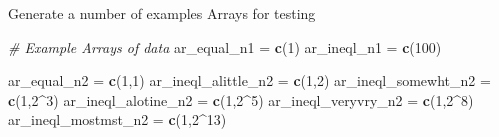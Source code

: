 \documentclass[
]{book}
\newenvironment{Shaded}{\begin{snugshade}}{\end{snugshade}}
\newcommand{\CommentTok}[1]{\textcolor[rgb]{0.56,0.35,0.01}{\textit{#1}}}
\newcommand{\DecValTok}[1]{\textcolor[rgb]{0.00,0.00,0.81}{#1}}
\newcommand{\KeywordTok}[1]{\textcolor[rgb]{0.13,0.29,0.53}{\textbf{#1}}}
\newcommand{\NormalTok}[1]{#1}
\newcommand{\OperatorTok}[1]{\textcolor[rgb]{0.81,0.36,0.00}{\textbf{#1}}}
\newcommand{\StringTok}[1]{\textcolor[rgb]{0.31,0.60,0.02}{#1}}
\begin{document}
Generate a number of examples Arrays for testing

\begin{Shaded}
\begin{Highlighting}[]
\CommentTok{\# Example Arrays of data}
\NormalTok{ar\_equal\_n1 =}\StringTok{ }\KeywordTok{c}\NormalTok{(}\DecValTok{1}\NormalTok{)}
\NormalTok{ar\_ineql\_n1 =}\StringTok{ }\KeywordTok{c}\NormalTok{(}\DecValTok{100}\NormalTok{)}

\NormalTok{ar\_equal\_n2 =}\StringTok{ }\KeywordTok{c}\NormalTok{(}\DecValTok{1}\NormalTok{,}\DecValTok{1}\NormalTok{)}
\NormalTok{ar\_ineql\_alittle\_n2 =}\StringTok{ }\KeywordTok{c}\NormalTok{(}\DecValTok{1}\NormalTok{,}\DecValTok{2}\NormalTok{)}
\NormalTok{ar\_ineql\_somewht\_n2 =}\StringTok{ }\KeywordTok{c}\NormalTok{(}\DecValTok{1}\NormalTok{,}\DecValTok{2}\OperatorTok{\^{}}\DecValTok{3}\NormalTok{)}
\NormalTok{ar\_ineql\_alotine\_n2 =}\StringTok{ }\KeywordTok{c}\NormalTok{(}\DecValTok{1}\NormalTok{,}\DecValTok{2}\OperatorTok{\^{}}\DecValTok{5}\NormalTok{)}
\NormalTok{ar\_ineql\_veryvry\_n2 =}\StringTok{ }\KeywordTok{c}\NormalTok{(}\DecValTok{1}\NormalTok{,}\DecValTok{2}\OperatorTok{\^{}}\DecValTok{8}\NormalTok{)}
\NormalTok{ar\_ineql\_mostmst\_n2 =}\StringTok{ }\KeywordTok{c}\NormalTok{(}\DecValTok{1}\NormalTok{,}\DecValTok{2}\OperatorTok{\^{}}\DecValTok{13}\NormalTok{)}


\end{Highlighting}
\end{Shaded}
\end{document}
